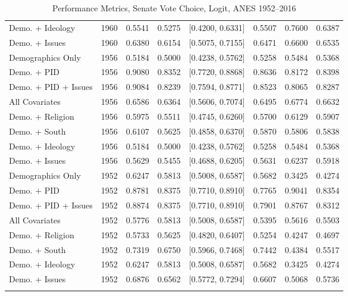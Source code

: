 \begin{longtable}{lrrrlrrr}
  Demo. + Ideology & 1960 & 0.5541 & 0.5275 & [0.4200, 0.6331] & 0.5507 & 0.7600 & 0.6387 \\ 
  Demo. + Issues & 1960 & 0.6380 & 0.6154 & [0.5075, 0.7155] & 0.6471 & 0.6600 & 0.6535 \\ 
  Demographics Only & 1956 & 0.5184 & 0.5000 & [0.4238, 0.5762] & 0.5258 & 0.5484 & 0.5368 \\ 
  Demo. + PID & 1956 & 0.9080 & 0.8352 & [0.7720, 0.8868] & 0.8636 & 0.8172 & 0.8398 \\ 
  Demo. + PID + Issues & 1956 & 0.9084 & 0.8239 & [0.7594, 0.8771] & 0.8523 & 0.8065 & 0.8287 \\ 
  All Covariates & 1956 & 0.6586 & 0.6364 & [0.5606, 0.7074] & 0.6495 & 0.6774 & 0.6632 \\ 
  Demo. + Religion & 1956 & 0.5975 & 0.5511 & [0.4745, 0.6260] & 0.5700 & 0.6129 & 0.5907 \\ 
  Demo. + South & 1956 & 0.6107 & 0.5625 & [0.4858, 0.6370] & 0.5870 & 0.5806 & 0.5838 \\ 
  Demo. + Ideology & 1956 & 0.5184 & 0.5000 & [0.4238, 0.5762] & 0.5258 & 0.5484 & 0.5368 \\ 
  Demo. + Issues & 1956 & 0.5629 & 0.5455 & [0.4688, 0.6205] & 0.5631 & 0.6237 & 0.5918 \\ 
  Demographics Only & 1952 & 0.6247 & 0.5813 & [0.5008, 0.6587] & 0.5682 & 0.3425 & 0.4274 \\ 
  Demo. + PID & 1952 & 0.8781 & 0.8375 & [0.7710, 0.8910] & 0.7765 & 0.9041 & 0.8354 \\ 
  Demo. + PID + Issues & 1952 & 0.8874 & 0.8375 & [0.7710, 0.8910] & 0.7901 & 0.8767 & 0.8312 \\ 
  All Covariates & 1952 & 0.5776 & 0.5813 & [0.5008, 0.6587] & 0.5395 & 0.5616 & 0.5503 \\ 
  Demo. + Religion & 1952 & 0.5733 & 0.5625 & [0.4820, 0.6407] & 0.5254 & 0.4247 & 0.4697 \\ 
  Demo. + South & 1952 & 0.7319 & 0.6750 & [0.5966, 0.7468] & 0.7442 & 0.4384 & 0.5517 \\ 
  Demo. + Ideology & 1952 & 0.6247 & 0.5813 & [0.5008, 0.6587] & 0.5682 & 0.3425 & 0.4274 \\ 
  Demo. + Issues & 1952 & 0.6876 & 0.6562 & [0.5772, 0.7294] & 0.6607 & 0.5068 & 0.5736 \\ 
   \bottomrule
\caption{Performance Metrics, Senate Vote Choice, Logit, ANES 1952--2016} 
\label{tab:ANES_senate_logit}
\end{longtable}
